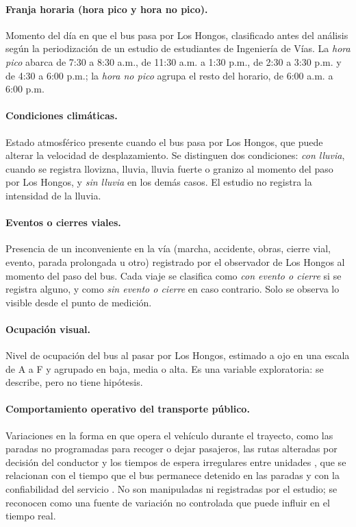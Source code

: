\paragraph{Franja horaria (hora pico y hora no pico).}
Momento del día en que el bus pasa por Los Hongos, clasificado antes del análisis según la periodización de un estudio de estudiantes de Ingeniería de Vías. La \emph{hora pico} abarca de 7:30 a 8:30 a.m., de 11:30 a.m. a 1:30 p.m., de 2:30 a 3:30 p.m. y de 4:30 a 6:00 p.m.; la \emph{hora no pico} agrupa el resto del horario, de 6:00 a.m. a 6:00 p.m.

\paragraph{Condiciones climáticas.}
Estado atmosférico presente cuando el bus pasa por Los Hongos, que puede alterar la velocidad de desplazamiento. Se distinguen dos condiciones: \emph{con lluvia}, cuando se registra llovizna, lluvia, lluvia fuerte o granizo al momento del paso por Los Hongos, y \emph{sin lluvia} en los demás casos. El estudio no registra la intensidad de la lluvia.

\paragraph{Eventos o cierres viales.}
Presencia de un inconveniente en la vía (marcha, accidente, obras, cierre vial, evento, parada prolongada u otro) registrado por el observador de Los Hongos al momento del paso del bus. Cada viaje se clasifica como \emph{con evento o cierre} si se registra alguno, y como \emph{sin evento o cierre} en caso contrario. Solo se observa lo visible desde el punto de medición.

\paragraph{Ocupación visual.}
Nivel de ocupación del bus al pasar por Los Hongos, estimado a ojo en una escala de A a F y agrupado en baja, media o alta. Es una variable exploratoria: se describe, pero no tiene hipótesis.

\paragraph{Comportamiento operativo del transporte público.}
Variaciones en la forma en que opera el vehículo durante el trayecto, como las paradas no programadas para recoger o dejar pasajeros, las rutas alteradas por decisión del conductor y los tiempos de espera irregulares entre unidades \cite{munoz2019}, que se relacionan con el tiempo que el bus permanece detenido en las paradas y con la confiabilidad del servicio \cite{arhin2015}. No son manipuladas ni registradas por el estudio; se reconocen como una fuente de variación no controlada que puede influir en el tiempo real.